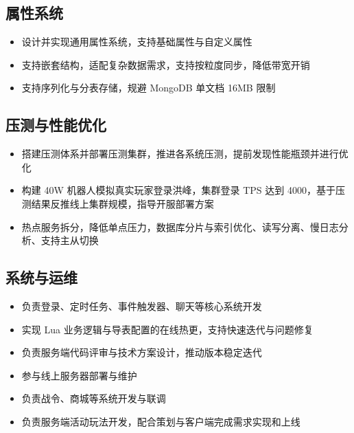 \documentclass{resume}
\begin{document}
\subsection{{属性系统}}
\begin{itemize}
  \item 设计并实现通用属性系统，支持基础属性与自定义属性
  \item 支持嵌套结构，适配复杂数据需求，支持按粒度同步，降低带宽开销
  \item 支持序列化与分表存储，规避 MongoDB 单文档 16MB 限制
\end{itemize}


\subsection{{压测与性能优化}}
\begin{itemize}
  \item 搭建压测体系并部署压测集群，推进各系统压测，提前发现性能瓶颈并进行优化
  \item 构建 40W 机器人模拟真实玩家登录洪峰，集群登录 TPS 达到 4000，基于压测结果反推线上集群规模，指导开服部署方案
  \item 热点服务拆分，降低单点压力，数据库分片与索引优化、读写分离、慢日志分析、支持主从切换
\end{itemize}


\subsection{{系统与运维}}
\begin{itemize}
  \item 负责登录、定时任务、事件触发器、聊天等核心系统开发
  \item 实现 Lua 业务逻辑与导表配置的在线热更，支持快速迭代与问题修复
  \item 负责服务端代码评审与技术方案设计，推动版本稳定迭代
  \item 参与线上服务器部署与维护
\end{itemize}




\begin{itemize}
  \item 负责战令、商城等系统开发与联调
  \item 负责服务端活动玩法开发，配合策划与客户端完成需求实现和上线
\end{itemize}
\end{document}
